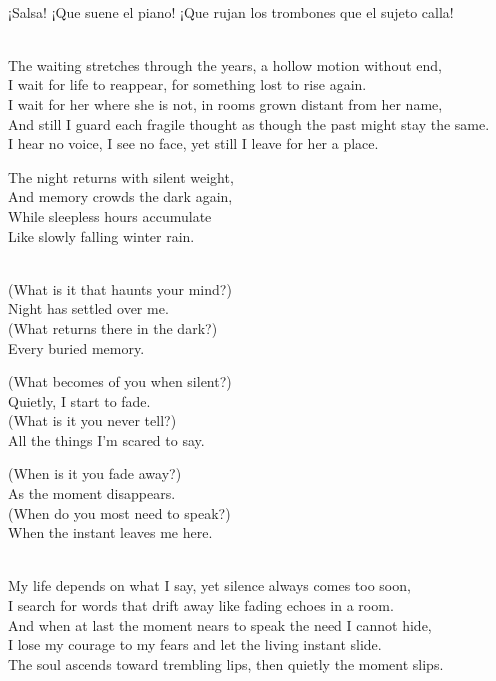 \begin{lyrics}
\\
¡Salsa! ¡Que suene el piano! ¡Que rujan los trombones que el sujeto calla!\\

\\
The waiting stretches through the years, a hollow motion without end,\\
I wait for life to reappear, for something lost to rise again.\\
I wait for her where she is not, in rooms grown distant from her name,\\
And still I guard each fragile thought as though the past might stay the same.\\
I hear no voice, I see no face, yet still I leave for her a place.

The night returns with silent weight,\\
And memory crowds the dark again,\\
While sleepless hours accumulate\\
Like slowly falling winter rain.

\\
 (What is it that haunts your mind?)\\
 Night has settled over me.\\
 (What returns there in the dark?)\\
 Every buried memory.

 (What becomes of you when silent?)\\
 Quietly, I start to fade.\\
 (What is it you never tell?)\\
 All the things I’m scared to say.

 (When is it you fade away?)\\
 As the moment disappears.\\
 (When do you most need to speak?)\\
 When the instant leaves me here.

\\
My life depends on what I say, yet silence always comes too soon,\\
I search for words that drift away like fading echoes in a room.\\
And when at last the moment nears to speak the need I cannot hide,\\
I lose my courage to my fears and let the living instant slide.\\
The soul ascends toward trembling lips, then quietly the moment slips.


\end{lyrics}
